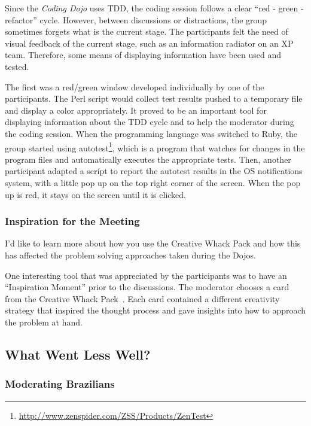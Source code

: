 Since the \emph{Coding Dojo} uses TDD, the coding session follows a
clear ``red - green - refactor'' cycle. However, between discussions or
distractions, the group sometimes forgets what is the current
stage. The participants felt the need of visual feedback of the
current stage, such as an information radiator on an XP team. Therefore,
some means of displaying information have been used and tested.

The first was a red/green window developed individually by one of the
participants. The Perl script would collect test results pushed to a
temporary file and display a color appropriately. It proved to be an
important tool for displaying information about the TDD cycle and
to help the moderator during the coding session. When the programming
language was switched to Ruby, the group started using
autotest\footnote{\url{http://www.zenspider.com/ZSS/Products/ZenTest}},
which is a program that watches for changes in the program files and
automatically executes the appropriate tests. Then, another participant
adapted a script to report the autotest results in the OS notifications
system, with a little pop up on the top right corner of the screen. When
the pop up is red, it stays on the screen until it is clicked.

\subsubsection{Inspiration for the Meeting}

{\Large I'd like to learn more about how you use the Creative Whack
  Pack and how this has affected the problem solving approaches taken
  during the Dojos.}

One interesting tool that was appreciated by the participants was
to have an ``Inspiration Moment'' prior to the discussions. The moderator
chooses a card from the Creative Whack Pack~\cite{Creative}. Each
card contained a different creativity strategy that inspired the thought
process and gave insights into how to approach the problem at hand.

\subsection{What Went Less Well?}\label{ssub:less_well}

\subsubsection{Moderating Brazilians}

